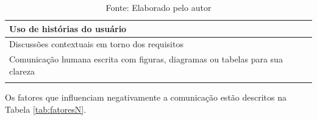 \begin{longtable}{|p{5cm}|p{10cm}|}
Uso de histórias do usuário                                                   & \cite{knauss2012detecting}                                            \\ \hline


Discussões contextuais em torno dos requisitos                                & \cite{stapel2009using}                                                  \\ \hline

Comunicação humana escrita com figuras, diagramas ou tabelas para sua clareza & \cite{8267930}                                                           \\ \hline


\caption{Fonte: Elaborado pelo autor}
\label{tab:fatoresP}


\end{longtable}
\newpage

Os fatores que influenciam negativamente a comunicação estão descritos na Tabela \ref{tab:fatoresN}. 

